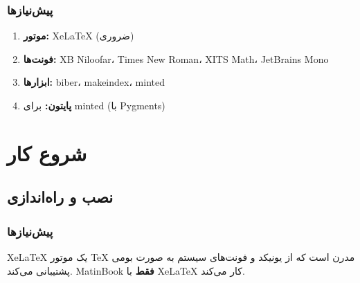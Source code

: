 \documentclass{matinbook}
\begin{document}
    \section*{پیش‌نیازها}
    
    \begin{enumerate}
        \item \textbf{موتور:} XeLaTeX (ضروری)
        \item \textbf{فونت‌ها:} XB Niloofar، Times New Roman،
        XITS Math، JetBrains Mono
        \item \textbf{ابزارها:} biber، makeindex، minted
        \item \textbf{پایتون:} برای minted (با Pygments)
    \end{enumerate}
    
    \clearpage
    
    \tableofcontents
    \clearpage
    
    \listoffigures
    \clearpage
    
    \listoftables
    \clearpage
    
    \listofalgorithms
    \clearpage
    \mainmatter
    
    \part{شروع کار}
    
    \chapter{نصب و راه‌اندازی}
    \label{chap:installation}
    
    \section{پیش‌نیازها}
    
    \begin{definition}[XeLaTeX]
        XeLaTeX یک موتور \TeX{} مدرن
        است که از یونیکد و فونت‌های سیستم
        به صورت بومی پشتیبانی می‌کند.
        MatinBook \textbf{فقط} با XeLaTeX کار می‌کند.
        \label{def:xelatex}
    \end{definition}
    
\end{document}
